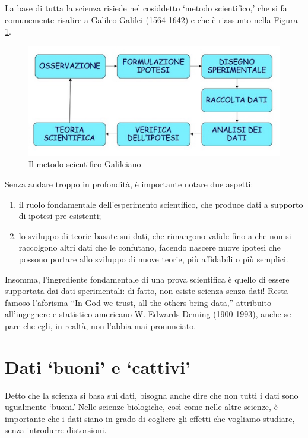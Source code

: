 \documentclass[a4paper,12pt,oneside]{book}
\providecommand{\tightlist}{%
  \setlength{\itemsep}{0pt}\setlength{\parskip}{0pt}}
\begin{document}
La base di tutta la scienza risiede nel cosiddetto `metodo scientifico,' che si fa comunemente risalire a Galileo Galilei (1564-1642) e che è riassunto nella Figura \ref{fig:figName11}.

\begin{figure}

{\centering \includegraphics[width=0.75\linewidth]{_images/MSAMap} 

}

\caption{Il metodo scientifico Galileiano}\label{fig:figName11}
\end{figure}

Senza andare troppo in profondità, è importante notare due aspetti:

\begin{enumerate}
\def\labelenumi{\arabic{enumi}.}
\tightlist
\item
  il ruolo fondamentale dell'esperimento scientifico, che produce dati a supporto di ipotesi pre-esistenti;
\item
  lo sviluppo di teorie basate sui dati, che rimangono valide fino a che non si raccolgono altri dati che le confutano, facendo nascere nuove ipotesi che possono portare allo sviluppo di nuove teorie, più affidabili o più semplici.
\end{enumerate}

Insomma, l'ingrediente fondamentale di una prova scientifica è quello di essere supportata dai dati sperimentali: di fatto, non esiste scienza senza dati! Resta famoso l'aforisma ``In God we trust, all the others bring data,'' attribuito all'ingegnere e statistico americano W. Edwards Deming (1900-1993), anche se pare che egli, in realtà, non l'abbia mai pronunciato.

\hypertarget{dati-buoni-e-cattivi}{%
\section{Dati `buoni' e `cattivi'}\label{dati-buoni-e-cattivi}}

Detto che la scienza si basa sui dati, bisogna anche dire che non tutti i dati sono ugualmente `buoni.' Nelle scienze biologiche, così come nelle altre scienze, è importante che i dati siano in grado di cogliere gli effetti che vogliamo studiare, senza introdurre distorsioni.
\end{document}
